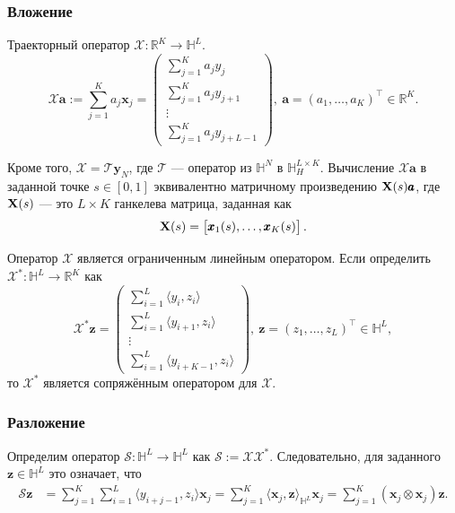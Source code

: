 \documentclass[a4paper, 11pt]{article}
\begin{document}
\subsubsection{Вложение}
Траекторный оператор $\mathcal{X}:\mathbb{R}^K \rightarrow \mathbb{H}^L$.
\begin{equation}
	\label{eq:traj}
	\mathcal{X}{\pmb a}:=\sum_{j=1}^K a_j{\pmb x}_j=
	\begin{pmatrix} \sum_{j=1}^K a_jy_j\\ \sum_{j=1}^K a_j y_{j+1}\\ \vdots\\ \sum_{j=1}^K a_j y_{j+L-1} \end{pmatrix},
	\ {\pmb a}=\left(a_1,\ldots, a_K\right)^\top \in\mathbb{R}^K.
\end{equation}
 
Кроме того, $\mathcal{X}=\mathcal{T}\textbf{y}_N$, где $\mathcal{T}$ — оператор из $\mathbb{H}^N$ в $\mathbb{H}_H^{L\times K}$. Вычисление $\mathcal{X} \pmb{a}$ в заданной точке $s\in [0,1]$ эквивалентно матричному произведению ${\bf X}(s)\pmb{a}$, где ${\bf X}(s)$ — это $L \times K$ ганкелева матрица, заданная как
\begin{equation}\label{ftraj}
	{\bf X}(s)=\begin{bmatrix} {\pmb x}_1(s), \ldots, {\pmb x}_K(s) \end{bmatrix}.
\end{equation}


Оператор $\mathcal{X}$ является ограниченным линейным оператором. Если определить $\mathcal{X}^*:\mathbb{H}^L \rightarrow \mathbb{R}^K$ как
\begin{equation}
	\mathcal{X}^*{\pmb z}=
	\begin{pmatrix} \sum_{i=1}^L \langle y_i, z_i\rangle\\ \sum_{i=1}^L \langle y_{i+1}, z_i\rangle\\ \vdots\\ \sum_{i=1}^L \langle y_{i+K-1}, z_i\rangle \end{pmatrix},
	\ {\pmb z}=\left(z_1,\ldots, z_L\right)^\top\in\mathbb{H}^L,
\end{equation}
то $\mathcal{X}^*$ является сопряжённым оператором для $\mathcal{X}$.

\subsubsection{Разложение}
Определим оператор $\mathcal{S}: \mathbb{H}^L\rightarrow \mathbb{H}^L$ как $\mathcal{S}:=\mathcal{X}\mathcal{X}^*$. Следовательно, для заданного ${\pmb z}\in \mathbb{H}^{L}$ это означает, что
\begin{align}\label{eq: s-operator}
	\mathcal{S}{\pmb z} &
	=\sum_{j=1}^K\sum_{i=1}^L \langle y_{i+j-1} , z_i \rangle {\pmb x}_j
	=\sum_{j=1}^K \langle {\pmb x}_j , {\pmb z} \rangle_{\mathbb{H}^L} {\pmb x}_j
	=\sum_{j=1}^K ({\pmb x}_j \otimes {\pmb x}_j) {\pmb z}.
\end{align}
\end{document}
